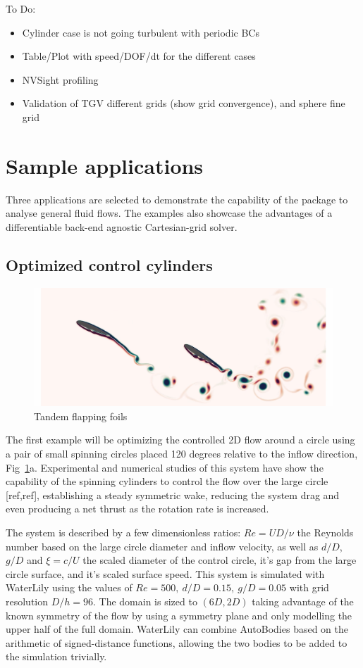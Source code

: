 \documentclass[final,3p,times]{elsarticle}
\begin{document}
To Do:
\begin{itemize}
  \item Cylinder case is not going turbulent with periodic BCs
  \item Table/Plot with speed/DOF/dt for the different cases
  \item NVSight profiling
  \item Validation of TGV different grids (show grid convergence), and sphere fine grid
\end{itemize}

\section{Sample applications}\label{sec:applications}
Three applications are selected to demonstrate the capability of the package to analyse general fluid flows. The examples also showcase the advantages of a differentiable back-end agnostic Cartesian-grid solver.

\subsection{Optimized control cylinders}

\begin{figure}
    \includegraphics[width=\linewidth]{img/tandem.png}
    \caption{Tandem flapping foils}
    \label{fig:spinning_circle}
\end{figure}

The first example will be optimizing the controlled 2D flow around a circle using a pair of small spinning circles placed 120 degrees relative to the inflow direction, Fig~\ref{fig:spinning_circle}a. Experimental and numerical studies of this system have show the capability of the spinning cylinders to control the flow over the large circle [ref,ref], establishing a steady symmetric wake, reducing the system drag and even producing a net thrust as the rotation rate is increased.

The system is described by a few dimensionless ratios: $Re=UD/\nu$ the Reynolds number based on the large circle diameter and inflow velocity, as well as $d/D$, $g/D$ and $\xi=c/U$ the scaled diameter of the control circle, it's gap from the large circle surface, and it's scaled surface speed. This system is simulated with WaterLily using the values of $Re=500,\ d/D=0.15,\ g/D=0.05$ with grid resolution $D/h=96$. The domain is sized to $(6D,2D)$ taking advantage of the known symmetry of the flow by using a symmetry plane and only modelling the upper half of the full domain. WaterLily can combine AutoBodies based on the arithmetic of signed-distance functions, allowing the two bodies to be added to the simulation trivially.
\end{document}
